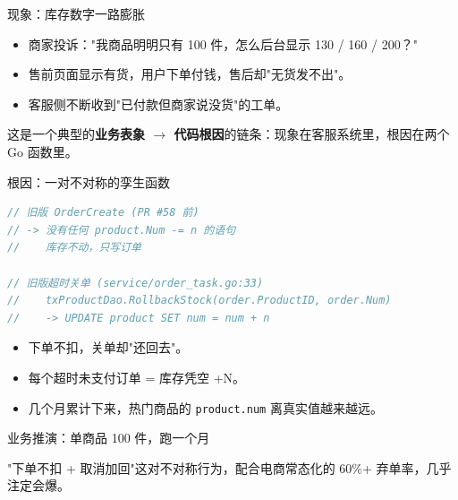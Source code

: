 \begin{frame}[fragile]{现象：库存数字一路膨胀}
\begin{itemize}
  \item 商家投诉："我商品明明只有 100 件，怎么后台显示 130 / 160 / 200？"
  \item 售前页面显示有货，用户下单付钱，售后却"无货发不出"。
  \item 客服侧不断收到"已付款但商家说没货"的工单。
\end{itemize}
\vspace{2mm}
\small 这是一个典型的\textbf{业务表象 $\to$ 代码根因}的链条：现象在客服系统里，根因在两个 Go 函数里。
\end{frame}

\begin{frame}[fragile]{根因：一对不对称的孪生函数}
\begin{lstlisting}[language=Go,basicstyle=\ttfamily\scriptsize]
// 旧版 OrderCreate (PR #58 前)
// -> 没有任何 product.Num -= n 的语句
//    库存不动，只写订单

// 旧版超时关单 (service/order_task.go:33)
//    txProductDao.RollbackStock(order.ProductID, order.Num)
//    -> UPDATE product SET num = num + n
\end{lstlisting}
\vspace{2mm}
\begin{itemize}
  \item 下单不扣，关单却"还回去"。
  \item 每个超时未支付订单 = 库存凭空 +N。
  \item 几个月累计下来，热门商品的 \texttt{product.num} 离真实值越来越远。
\end{itemize}
\end{frame}

\begin{frame}{业务推演：单商品 100 件，跑一个月}
\vspace{2mm}
\small "下单不扣 + 取消加回"这对不对称行为，配合电商常态化的 60\%+ 弃单率，几乎注定会爆。
\end{frame}

